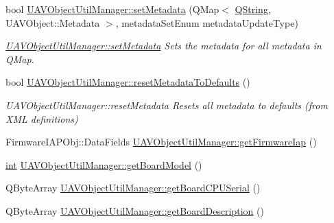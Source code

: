\begin{DoxyCompactItemize}
bool \hyperlink{group___u_a_v_object_util_plugin_gab813cc6401727303f0787527bbd29ad1}{U\-A\-V\-Object\-Util\-Manager\-::set\-Metadata} (Q\-Map$<$ \hyperlink{group___u_a_v_objects_plugin_gab9d252f49c333c94a72f97ce3105a32d}{Q\-String}, U\-A\-V\-Object\-::\-Metadata $>$, metadata\-Set\-Enum metadata\-Update\-Type)
\begin{DoxyCompactList}\small\item\em \hyperlink{group___u_a_v_object_util_plugin_gab813cc6401727303f0787527bbd29ad1}{U\-A\-V\-Object\-Util\-Manager\-::set\-Metadata} Sets the metadata for all metadata in Q\-Map. \end{DoxyCompactList}\item 
bool \hyperlink{group___u_a_v_object_util_plugin_ga8fadd2e0c6ed3b69a1f8059d2c98054c}{U\-A\-V\-Object\-Util\-Manager\-::reset\-Metadata\-To\-Defaults} ()
\begin{DoxyCompactList}\small\item\em U\-A\-V\-Object\-Util\-Manager\-::reset\-Metadata Resets all metadata to defaults (from X\-M\-L definitions) \end{DoxyCompactList}\item 
Firmware\-I\-A\-P\-Obj\-::\-Data\-Fields \hyperlink{group___u_a_v_object_util_plugin_gabd93ae6b2c3ecb8444184c8aaf2176bb}{U\-A\-V\-Object\-Util\-Manager\-::get\-Firmware\-Iap} ()
\item 
\hyperlink{ioapi_8h_a787fa3cf048117ba7123753c1e74fcd6}{int} \hyperlink{group___u_a_v_object_util_plugin_ga45c8f562def61c9273af2b243d981114}{U\-A\-V\-Object\-Util\-Manager\-::get\-Board\-Model} ()
\item 
Q\-Byte\-Array \hyperlink{group___u_a_v_object_util_plugin_ga11c8171d7e380e699b4edf9b6860a236}{U\-A\-V\-Object\-Util\-Manager\-::get\-Board\-C\-P\-U\-Serial} ()
\item 
Q\-Byte\-Array \hyperlink{group___u_a_v_object_util_plugin_ga1c07eaa903b38480c6eb46b1a312f66e}{U\-A\-V\-Object\-Util\-Manager\-::get\-Board\-Description} ()
\end{DoxyCompactItemize}
